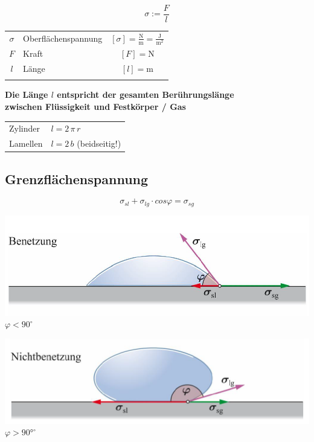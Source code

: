 $$ \boxed{ \sigma := \frac{F}{l} } $$ 


	\begin{tabular}{c l c}
		\rule{0pt}{10pt}$\sigma$ & Oberflächenspannung & $[\sigma] = \mathrm{\frac{N}{m}} = \mathrm{\frac{J}{m^2}}$ \\
		$F$ & Kraft & $[F] = \mathrm{N} $ \\
		$l$ & Länge & $[l] = \mathrm{m}$  \\
		\\
	\end{tabular}
	
	\textbf{Die Länge $l$ entspricht der gesamten Berührungslänge  \\
	zwischen Flüssigkeit und Festkörper / Gas} \\
	
	\begin{tabular}{ll}
	Zylinder & $l = 2 \, \pi \, r$ \\
	Lamellen & $l = 2 \, b$  (beidseitig!) \\
	\end{tabular}


\subsection{Grenzflächenspannung}

$$ \boxed{ \sigma_{sl} + \sigma_{lg} \cdot cos \varphi = \sigma_{sg }} $$

\begin{minipage}{0.48\linewidth}
	\includegraphics[width=\linewidth]{Bilder/benetzung.png} \\
	$ \varphi < 90 ^{\circ} $
\end{minipage}
\hfill
\begin{minipage}{0.48\linewidth}
	\includegraphics[width=\linewidth]{Bilder/nichtbenetzung.png} \\
	$ \varphi > 90° ^{\circ}$
\end{minipage}





